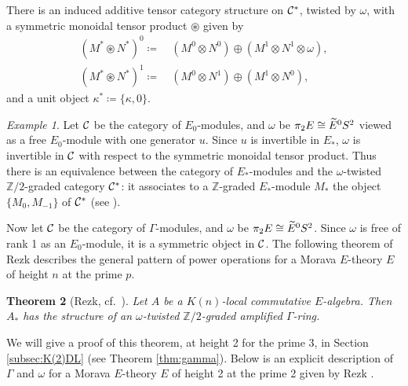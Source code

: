 \documentclass{gtpart}
\newtheorem{thm}{Theorem}
\theoremstyle{definition}
\theoremstyle{remark}
\newtheorem{ex}[thm]{Example}
\newcommand{\mb}[1]{\mathbb{#1}}
\newcommand{\CC}{{\cal C}}
\newcommand{\BZ}{{\mb Z}}
\newcommand{\TE}{\widetilde{E\thinspace}\!}
\newcommand{\G}{\Gamma}
\newcommand{\K}{\kappa}
\newcommand{\ce}{\coloneqq}
\numberwithin{equation}{section}
\numberwithin{thm}{section}
\begin{document}
There is an induced additive tensor category structure on $\CC^*$, 
twisted by $\omega$, with a symmetric monoidal tensor product 
$\circledast$ given by 
\begin{equation*}
\begin{split}
 (M^* \circledast N^*)^0 \ce & ~ (M^0 \otimes N^0) \oplus (M^1 \otimes N^1 \otimes \omega), \\
 (M^* \circledast N^*)^1 \ce & ~ (M^0 \otimes N^1) \oplus (M^1 \otimes N^0), 
\end{split}
\end{equation*}
and a unit object $\K^* \ce \{ \K,0 \}$.  

\begin{ex}
 Let $\CC$ be the category of $E_0$-modules, and $\omega$ be 
 $\pi_2 E \cong \TE^0 S^2$ viewed as a free $E_0$-module with one 
 generator $u$.  Since $u$ is invertible in $E_*$, $\omega$ is 
 invertible in $\CC$ with respect to the symmetric monoidal tensor 
 product.  Thus there is an equivalence between the category of 
 $E_*$-modules and the $\omega$-twisted $\BZ/2$-graded category $\CC^*$: 
 it associates to a $\BZ$-graded $E_*$-module $M_*$ the object 
 $\{ M_0, M_{-1} \}$ of $\CC^*$ (see \cite[2.9-10]{cong}).  
\end{ex}

Now let $\CC$ be the category of $\G$-modules, and $\omega$ be 
$\pi_2 E \cong \TE^0 S^2$.  Since $\omega$ is free of rank 1 as an 
$E_0$-module, it is a symmetric object in $\CC$.  The following theorem 
of Rezk describes the general pattern of power operations for a Morava 
$E$-theory $E$ of height $n$ at the prime $p$.  

\begin{thm}[Rezk, cf.~\cite{slides, cong}]
\label{thm:rezk}
 Let $A$ be a $K(n)$-local commutative $E$-algebra.  Then $A_*$ has the 
 structure of an $\omega$-twisted $\BZ/2$-graded amplified $\G$-ring.  
\end{thm}

We will give a proof of this theorem, at height 2 for the prime 3, in 
Section \ref{subsec:K(2)DL} (see Theorem \ref{thm:gamma}).  Below is an 
explicit description of $\G$ and $\omega$ for a Morava $E$-theory $E$ of 
height 2 at the prime 2 given by Rezk \cite[Section 2]{h2p2}.  
\end{document}
